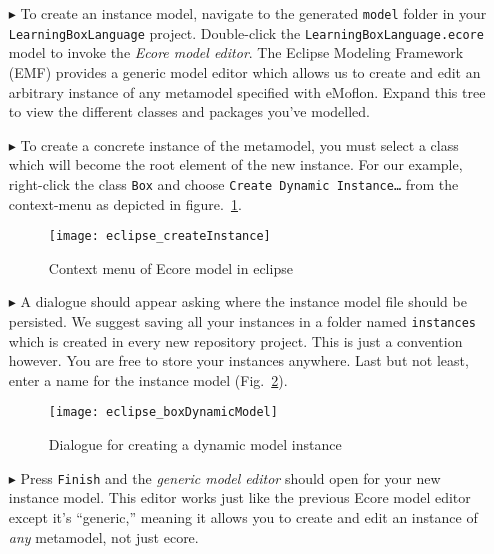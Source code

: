 \begin{itemize}

\item[$\blacktriangleright$] To create an instance model, navigate to the generated \texttt{model} folder in your \texttt{LearningBoxLanguage} project.
Double-click the \texttt{LearningBoxLanguage.ecore} model to invoke  the \emph{Ecore model editor}. The Eclipse Modeling Framework (EMF) provides a generic
model editor which allows us to create and edit an arbitrary instance of any metamodel specified with eMoflon. Expand this tree to view the different classes
and packages you've modelled.

\item[$\blacktriangleright$] To create a concrete instance of the metamodel, you must select a class which will become the root element of the new instance.
For our example, right-click the class \texttt{Box} and choose \texttt{Create Dynamic Instance\ldots} from the context-menu as depicted in
figure.~\ref{fig:context_menu}.

\begin{figure}[htbp]
	\centering
  \texttt{[image: eclipse\_createInstance]}
	\caption{Context menu of Ecore model in eclipse}
	\label{fig:context_menu}
\end{figure}


\item[$\blacktriangleright$] A dialogue should appear asking where the instance model file should be persisted. We suggest saving all your instances in a folder
named \texttt{instances} which is created in every new repository project. This is just a convention however. You are free to store your instances anywhere.
Last but not least, enter a name for the instance model (Fig.~\ref{fig:store_dynamic_instance}).

\begin{figure}[htbp]
	\centering
  \texttt{[image: eclipse\_boxDynamicModel]}
	\caption{Dialogue for creating a dynamic model instance}
	\label{fig:store_dynamic_instance}
\end{figure}

\item[$\blacktriangleright$] Press \texttt{Finish} and the \emph{generic model editor} should open for your new instance model. This editor works just like the
previous Ecore model editor except it's ``generic,'' meaning it allows you to create and edit an instance of \emph{any} metamodel, not just ecore.


\end{itemize}
